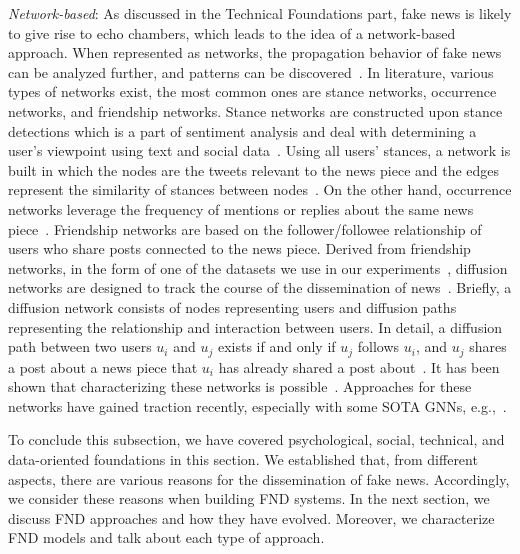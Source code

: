 \begin{description}
    \item{\emph{Network-based}:} As discussed in the Technical Foundations part, fake news is likely to give rise to echo chambers, which leads to the idea of a network-based approach. When represented as networks, the propagation behavior of fake news can be analyzed further, and patterns can be discovered~\parencite{FakeNewsDetectionOnSocialMediaADataMiningPerspective_Shu}. In literature, various types of networks exist, the most common ones are stance networks, occurrence networks, and friendship networks. Stance networks are constructed upon stance detections which is a part of sentiment analysis and deal with determining a user’s viewpoint using text and social data~\parencite{StanceClassificationAttention_Du}. Using all users’ stances, a network is built in which the nodes are the tweets relevant to the news piece and the edges represent the similarity of stances between nodes~\parencite{NewsVerificationByExploitingConflictingSocialViewpoints_Jin, SomeLikeItHoaxDataset_Tacchini}. On the other hand, occurrence networks leverage the frequency of mentions or replies about the same news piece~\parencite{ProminentFeaturesOfRumorPropagation_Kwon}. Friendship networks are based on the follower/followee relationship of users who share posts connected to the news piece. Derived from friendship networks, in the form of one of the datasets we use in our experiments~\parencite{UPFD_Dataset_Shu}, diffusion networks are designed to track the course of the dissemination of news~\parencite{ProminentFeaturesOfRumorPropagation_Kwon}. Briefly, a diffusion network consists of nodes representing users and diffusion paths representing the relationship and interaction between users. In detail, a diffusion path between two users $u_i$ and $u_j$ exists if and only if $u_j$ follows $u_i$, and $u_j$ shares a post about a news piece that $u_i$ has already shared a post about~\parencite{FakeNewsDetectionOnSocialMediaADataMiningPerspective_Shu}. It has been shown that characterizing these networks is possible~\parencite{ProminentFeaturesOfRumorPropagation_Kwon}. Approaches for these networks have gained traction recently, especially with some SOTA GNNs, e.g.,~\parencite{FakeNewsDetectionUsingGeometricDeepLearning_Monti}.
\end{description}
To conclude this subsection, we have covered psychological, social, technical, and data-oriented foundations in this section. We established that,  from different aspects, there are various reasons for the dissemination of fake news. Accordingly, we consider these reasons when building FND systems. In the next section, we discuss FND approaches and how they have evolved. Moreover, we characterize FND models and talk about each type of approach.

